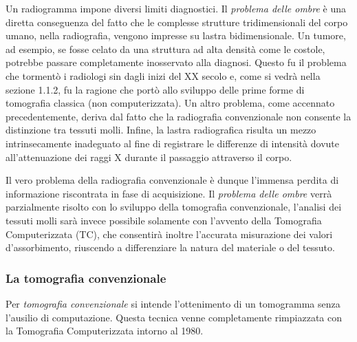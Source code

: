 \documentclass[a4paper,11pt, oneside]{article}
\begin{document}
                    \par
                        Un radiogramma impone diversi limiti diagnostici. Il \textit{problema delle ombre} è una diretta conseguenza del fatto che le complesse strutture tridimensionali del corpo umano, nella radiografia, vengono impresse su lastra bidimensionale. Un tumore, ad esempio, se fosse celato da una struttura ad alta densità come le costole, potrebbe passare completamente inosservato alla diagnosi. Questo fu il problema che tormentò i radiologi sin dagli inizi del XX secolo e, come si vedrà nella sezione 1.1.2, fu la ragione che portò allo sviluppo delle prime forme di tomografia classica (non computerizzata).
                        Un altro problema, come accennato precedentemente, deriva dal fatto che la radiografia convenzionale non consente la distinzione tra tessuti molli. Infine, la lastra radiografica risulta un mezzo intrinsecamente inadeguato al fine di registrare le differenze di intensità dovute all'attenuazione dei raggi X durante il passaggio attraverso il corpo.
                    \par
                        Il vero problema della radiografia convenzionale è dunque l'immensa perdita di informazione riscontrata in fase di acquisizione. Il \textit{problema delle ombre} verrà parzialmente risolto con lo sviluppo della tomografia convenzionale, l'analisi dei tessuti molli sarà invece possibile solamente con l'avvento della Tomografia Computerizzata (TC), che consentirà inoltre l'accurata misurazione dei valori d'assorbimento, riuscendo a differenziare la natura del materiale o del tessuto.
                        
                \subsubsection{La tomografia convenzionale}
                    \par
                        Per \textit{tomografia convenzionale} si intende l'ottenimento di un tomogramma senza l'ausilio di computazione. Questa tecnica venne completamente rimpiazzata con la Tomografia Computerizzata intorno al 1980.
                        
\end{document}
